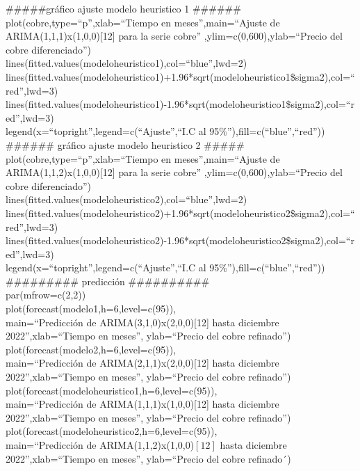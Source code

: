 \documentclass{report}
\begin{document}
\#\#\#\#\#gráfico ajuste modelo heuristico 1 \#\#\#\#\#\# \\
plot(cobre,type=``p'',xlab=``Tiempo en meses'',main=``Ajuste de ARIMA(1,1,1)x(1,0,0)[12] para la serie cobre''
     ,ylim=c(0,600),ylab=``Precio del cobre diferenciado'')\\
lines(fitted.values(modeloheuristico1),col=``blue'',lwd=2)\\
lines(fitted.values(modeloheuristico1)+1.96*sqrt(modeloheuristico1\$sigma2),col=``red'',lwd=3)\\
lines(fitted.values(modeloheuristico1)-1.96*sqrt(modeloheuristico1\$sigma2),col=``red'',lwd=3)\\
legend(x=``topright'',legend=c(``Ajuste'',``I.C al 95\%''),fill=c(``blue'',``red''))\\

\#\#\#\#\#\# gráfico ajuste modelo heuristico 2 \#\#\#\#\# \\
plot(cobre,type=``p'',xlab=``Tiempo en meses'',main=``Ajuste de ARIMA(1,1,2)x(1,0,0)[12] para la serie cobre''
     ,ylim=c(0,600),ylab=``Precio del cobre diferenciado'')\\
lines(fitted.values(modeloheuristico2),col=``blue'',lwd=2)\\
lines(fitted.values(modeloheuristico2)+1.96*sqrt(modeloheuristico2\$sigma2),col=``red'',lwd=3)\\
lines(fitted.values(modeloheuristico2)-1.96*sqrt(modeloheuristico2\$sigma2),col=``red'',lwd=3)\\
legend(x=``topright'',legend=c(``Ajuste'',``I.C al 95\%''),fill=c(``blue'',``red''))\\

\#\#\#\#\#\#\#\#\# predicción \#\#\#\#\#\#\#\#\#\# \\
par(mfrow=c(2,2))\\
plot(forecast(modelo1,h=6,level=c(95)),\\
     main=``Predicción de ARIMA(3,1,0)x(2,0,0)[12] hasta diciembre 2022'',xlab=``Tiempo en meses'',
     ylab=``Precio del cobre refinado'')\\
plot(forecast(modelo2,h=6,level=c(95)),\\
     main=``Predicción de ARIMA(2,1,1)x(2,0,0)[12] hasta diciembre 2022'',xlab=``Tiempo en meses'',
     ylab=``Precio del cobre refinado'')\\
plot(forecast(modeloheuristico1,h=6,level=c(95)),\\
     main=``Predicción de ARIMA(1,1,1)x(1,0,0)[12] hasta diciembre 2022'',xlab=``Tiempo en meses'',
     ylab=``Precio del cobre refinado'')\\
plot(forecast(modeloheuristico2,h=6,level=c(95)),\\
     main=``Predicción de ARIMA(1,1,2)x(1,0,0)$\left[12\right]$ hasta diciembre 2022'',xlab=``Tiempo en meses'',
     ylab=``Precio del cobre refinado´)\\
\end{document}
